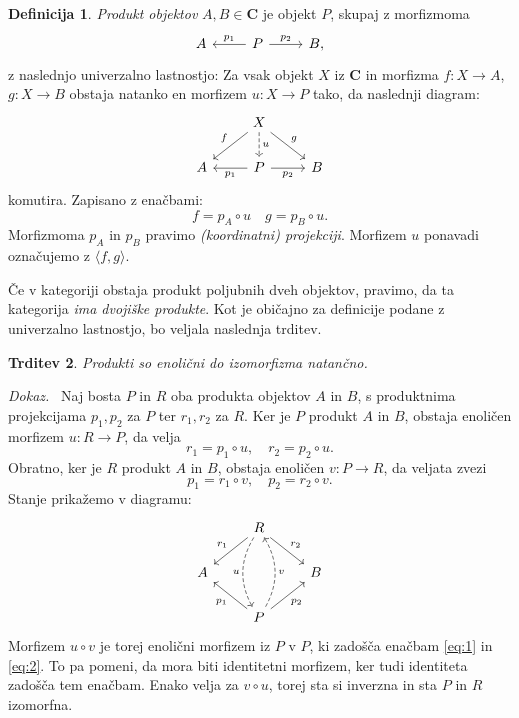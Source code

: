 \documentclass[12pt,a4paper]{book}
\theoremstyle{definition}
\newtheorem{definicija}{Definicija}[chapter]
\theoremstyle{plain}
\newtheorem{trditev}[definicija]{Trditev}
\newenvironment{dokaz}{\emph{Dokaz.}\ }{\hspace{\fill}{$\Box$}}
\theoremstyle{definition}
\theoremstyle{remark}
\newcommand{\cat}[1]{\textbf{#1}}
\begin{document}
\begin{definicija}
\emph{Produkt objektov} $A,B \in \cat{C}$ je objekt $P$, skupaj z morfizmoma
$$\begin{tikzcd}
A & P \ar[l, "p_1"'] \ar[r, "p_2"] & B,
\end{tikzcd}$$
z naslednjo univerzalno lastnostjo: Za vsak objekt $X$ iz $\cat{C}$ in morfizma $f : X \to A$, $g : X \to B$ obstaja natanko en morfizem $u : X \to P$ tako, da naslednji diagram:
%
$$\begin{tikzcd}
& X \ar[ld, "f"'] \ar[d, dashed, "u"] \ar[rd, "g"] & \\
A & P \ar[l, "p_1"] \ar[r, "p_2"'] & B
\end{tikzcd}$$
%
komutira. Zapisano z enačbami:
$$f = p_A \circ u \quad g = p_B \circ u.$$
Morfizmoma $p_A$ in $p_B$ pravimo \emph{(koordinatni) projekciji}. Morfizem $u$ ponavadi označujemo z $\langle f,g \rangle$.
\end{definicija}
%
Če v kategoriji obstaja produkt poljubnih dveh objektov, pravimo, da ta kategorija \emph{ima dvojiške produkte}.
%
Kot je običajno za definicije podane z univerzalno lastnostjo, bo veljala naslednja trditev.
%
\begin{trditev}
Produkti so enolični do izomorfizma natančno.
\end{trditev}
\begin{dokaz}
Naj bosta $P$ in $R$ oba produkta objektov $A$ in $B$, s produktnima projekcijama $p_1, p_2$ za $P$ ter $r_1, r_2$ za $R$. Ker je $P$ produkt $A$ in $B$, obstaja enoličen morfizem $u : R \to P$, da velja 
\begin{equation}
r_1 = p_1 \circ u, \quad r_2 = p_2 \circ u. \label{eq:1}
\end{equation}
Obratno, ker je $R$ produkt $A$ in $B$, obstaja enoličen $v : P \to R$, da veljata zvezi
\begin{equation}
p_1 = r_1 \circ v, \quad p_2 = r_2 \circ v. \label{eq:2}
\end{equation}
Stanje prikažemo v diagramu:
%
$$\begin{tikzcd}
& R \ar[dd, dashed, bend right, "u"'] \ar[dl, "r_1"'] \ar[dr, "r_2"] & \\
A & & B \\
& P \ar[uu, dashed, bend right, "v"'] \ar[ul, "p_1"] \ar[ur, "p_2"'] &
\end{tikzcd}$$
%
Morfizem $u \circ v $ je torej enolični morfizem iz $P$ v $P$, ki zadošča enačbam \eqref{eq:1} in \eqref{eq:2}. To pa pomeni, da mora biti identitetni morfizem, ker tudi identiteta zadošča tem enačbam. Enako velja za $v \circ u$, torej sta si inverzna in sta $P$ in $R$ izomorfna.
\end{dokaz}
\end{document}
